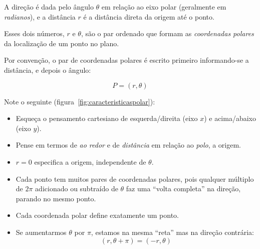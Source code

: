 A direção é dada pelo ângulo $\theta$ em relação ao eixo polar
(geralmente em \emph{radianos}), e a distância $r$ é a distância
direta da origem até o ponto.

Esses dois números, $r$ e $\theta$,
são o par ordenado que formam as \emph{coordenadas polares} da
localização de um ponto no plano.

Por convenção, o par de coordenadas
polares é escrito primeiro informando-se a distância, e depois o ângulo:

\begin{equation}
  P = (r, \theta)
\end{equation}

Note o seguinte (figura~\ref{fig:caracteristicaspolar}):

\begin{itemize}[noitemsep]
  \item Esqueça o pensamento cartesiano de esquerda/direita (eixo $x$)
    e acima/abaixo (eixo $y$).
  \item Pense em termos de \emph{ao redor} e de
    \emph{distância} em relação ao \emph{polo}, a origem.
  \item $r = 0$ especifica a origem, independente de $\theta$.
  \item Cada ponto tem muitos pares de coordenadas polares, pois
    qualquer múltiplo de $2\pi$ adicionado ou subtraído de $\theta$
    faz uma ``volta completa'' na direção, parando no mesmo ponto.
  \item Cada coordenada polar define exatamente um ponto.
  \item Se aumentarmos $\theta$ por $\pi$, estamos na mesma ``reta''
    mas na direção contrária:
    \begin{equation}
      (r, \theta + \pi) = (-r, \theta)
    \end{equation}
\end{itemize}

